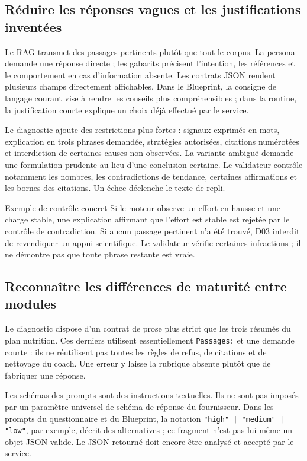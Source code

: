 \subsection{Réduire les réponses vagues et les justifications inventées}
Le RAG transmet des passages pertinents plutôt que tout le corpus. La persona demande une réponse directe ; les gabarits précisent l'intention, les références et le comportement en cas d'information absente. Les contrats JSON rendent plusieurs champs directement affichables. Dans le Blueprint, la consigne de langage courant vise à rendre les conseils plus compréhensibles ; dans la routine, la justification courte explique un choix déjà effectué par le service.

Le diagnostic ajoute des restrictions plus fortes : signaux exprimés en mots, explication en trois phrases demandée, stratégies autorisées, citations numérotées et interdiction de certaines causes non observées. La variante ambiguë demande une formulation prudente au lieu d'une conclusion certaine. Le validateur contrôle notamment les nombres, les contradictions de tendance, certaines affirmations et les bornes des citations. Un échec déclenche le texte de repli.

\begin{principlebox}{Exemple de contrôle concret}
Si le moteur observe un effort en hausse et une charge stable, une explication affirmant que l'effort est stable est rejetée par le contrôle de contradiction. Si aucun passage pertinent n'a été trouvé, D03 interdit de revendiquer un appui scientifique. Le validateur vérifie certaines infractions ; il ne démontre pas que toute phrase restante est vraie.
\end{principlebox}

\subsection{Reconnaître les différences de maturité entre modules}
Le diagnostic dispose d'un contrat de prose plus strict que les trois résumés du plan nutrition. Ces derniers utilisent essentiellement \texttt{Passages:} et une demande courte : ils ne réutilisent pas toutes les règles de refus, de citations et de nettoyage du coach. Une erreur y laisse la rubrique absente plutôt que de fabriquer une réponse.

Les schémas des prompts sont des instructions textuelles. Ils ne sont pas imposés par un paramètre universel de schéma de réponse du fournisseur. Dans les prompts du questionnaire et du Blueprint, la notation \texttt{"high" | "medium" | "low"}, par exemple, décrit des alternatives ; ce fragment n'est pas lui-même un objet JSON valide. Le JSON retourné doit encore être analysé et accepté par le service.


